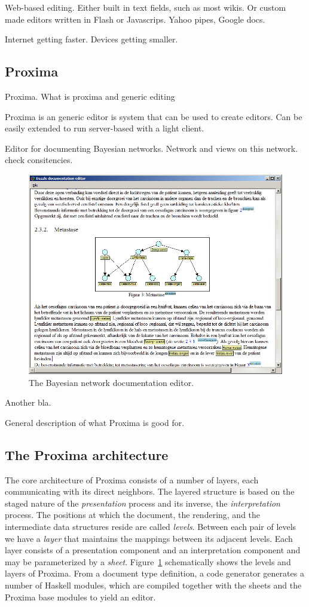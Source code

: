 \documentclass[10pt]{article}
\begin{document}
Web-based editing. Either built in text fields, such as most wikis. Or custom made editors written in Flash or Javascrips. Yahoo pipes, Google docs.

Internet getting faster. Devices getting smaller. 

\subsection{Proxima}
Proxima. What is proxima and generic editing

Proxima is an generic editor is system that can be used to create editors. Can be easily extended to run server-based with a light client.

Editor for documenting Bayesian networks. Network and views on this network. check consitencies.

\begin{figure}
\includegraphics[width=12cm]{images/subgraph}
\caption{The Bayesian network documentation editor.}
\label{fig:levelsAndLayers}
\end{figure}

Another bla.

General description of what Proxima is good for.


\subsection{The Proxima architecture}

The core architecture of Proxima consists of a number of layers, each communicating with its direct neighbors. The layered structure is based on the staged nature of the {\em presentation} process and its inverse, the {\em interpretation} process. The positions at which the document, the rendering, and the intermediate data structures reside are called {\em levels}. Between each pair of levels we have a {\em layer} that maintains the mappings between its adjacent levels. Each layer consists of a presentation component and an interpretation component and may be parameterized by a {\em sheet}. Figure~\ref{fig:levelsAndLayers} schematically shows the levels and layers of Proxima. From a document type definition, a code generator generates a number of Haskell modules, which are compiled together with the sheets and the Proxima base modules to yield an editor. 
\end{document}
